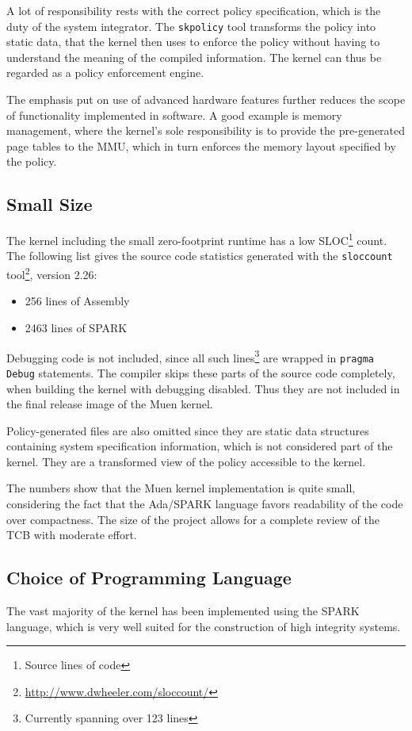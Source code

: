 A lot of responsibility rests with the correct policy specification, which is
the duty of the system integrator. The \texttt{skpolicy} tool transforms the
policy into static data, that the kernel then uses to enforce the policy without
having to understand the meaning of the compiled information. The kernel can
thus be regarded as a policy enforcement engine.

The emphasis put on use of advanced hardware features further reduces the scope
of functionality implemented in software. A good example is memory management,
where the kernel's sole responsibility is to provide the pre-generated page
tables to the MMU, which in turn enforces the memory layout specified by the
policy.

\subsection{Small Size}
The kernel including the small zero-footprint runtime has a low
SLOC\footnote{Source lines of code} count. The following list gives the source
code statistics generated with the \texttt{sloccount}
tool\footnote{\url{http://www.dwheeler.com/sloccount/}}, version 2.26:

\begin{itemize}
	\item 256 lines of Assembly
	\item 2463 lines of SPARK
\end{itemize}

Debugging code is not included, since all such lines\footnote{Currently spanning
over 123 lines} are wrapped in \texttt{pragma Debug} statements. The compiler
skips these parts of the source code completely, when building the kernel with
debugging disabled. Thus they are not included in the final release image of the
Muen kernel.

Policy-generated files are also omitted since they are static data structures
containing system specification information, which is not considered part of the
kernel. They are a transformed view of the policy accessible to the kernel.

The numbers show that the Muen kernel implementation is quite small, considering
the fact that the Ada/SPARK language favors readability of the code over
compactness. The size of the project allows for a complete review of the TCB
with moderate effort.

\subsection{Choice of Programming Language}
The vast majority of the kernel has been implemented using the SPARK language,
which is very well suited for the construction of high integrity systems.

